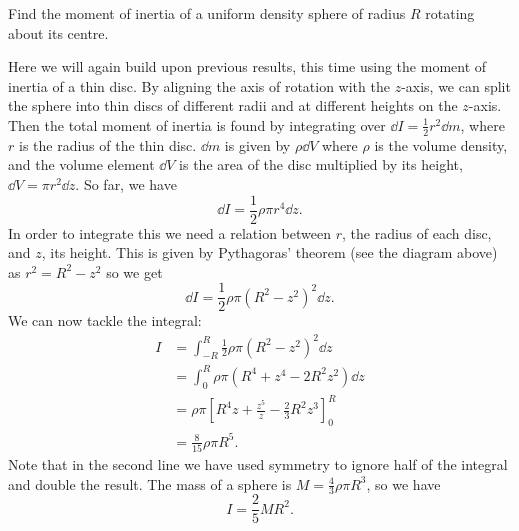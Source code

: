 \documentclass[../classical_mechanics.tex]{subfiles}
\begin{document}
            \begin{example}
                Find the moment of inertia of a uniform density sphere of radius $R$ rotating about its centre.
                        
                Here we will again build upon previous results, this time using the moment of inertia of a thin disc.
                By aligning the axis of rotation with the $z$-axis, we can split the sphere into thin discs of different radii and at different heights on the $z$-axis.
                Then the total moment of inertia is found by integrating over $\dd{I}=\frac{1}{2}r^2\dd{m}$, where $r$ is the radius of the thin disc.
                $\dd{m}$ is given by $\rho\dd{V}$ where $\rho$ is the volume density, and the volume element $\dd{V}$ is the area of the disc multiplied by its height, $\dd{V}=\pi r^2\dd{z}$.
                So far, we have
                \begin{equation}
                    \dd{I}=\frac{1}{2}\rho\pi r^4\dd{z}.
                \end{equation}
                In order to integrate this we need a relation between $r$, the radius of each disc, and $z$, its height.
                This is given by Pythagoras' theorem (see the diagram above) as $r^2=R^2-z^2$ so we get
                \begin{equation}
                    \dd{I}=\frac{1}{2}\rho\pi(R^2-z^2)^2\dd{z}.
                \end{equation}
                We can now tackle the integral:
                \begin{align}
                    I&=\int_{-R}^{R}\frac{1}{2}\rho\pi(R^2-z^2)^2\dd{z}\\
                    &=\int_0^R\rho\pi(R^4+z^4-2R^2z^2)\dd{z}\\
                    &=\rho\pi\left[R^4z+\frac{z^5}{z}-\frac{2}{3}R^2z^3\right]_0^R\\
                    &=\frac{8}{15}\rho\pi R^5.
                \end{align}
                Note that in the second line we have used symmetry to ignore half of the integral and double the result.
                The mass of a sphere is $M=\frac{4}{3}\rho\pi R^3$, so we have
                \begin{equation}
                    I=\frac{2}{5}MR^2.
                \end{equation}
            \end{example}
\end{document}
